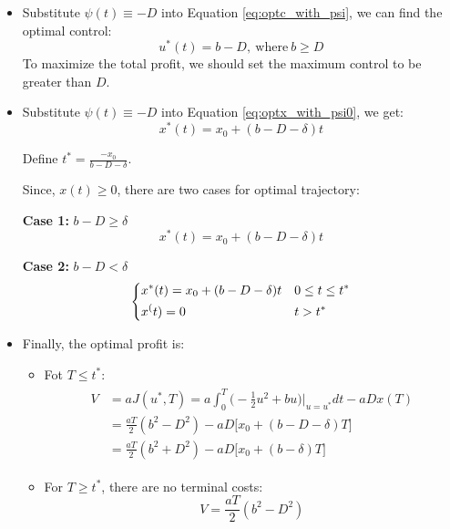 \documentclass{article}
\begin{document}
\begin{itemize}
    \item Substitute $\psi(t)\equiv-D$ into Equation \eqref{eq:optc_with_psi}, we can find the optimal control:
    \begin{equation}
        u^*(t)=b-D,\ \text{where}\ b\geq D
    \end{equation}
    To maximize the total profit, we should set the maximum control to be greater than $D$.
    \item Substitute $\psi(t)\equiv-D$ into Equation \eqref{eq:optx_with_psi0}, we get:
    \begin{equation}
        x^*(t)=x_0+(b-D-\delta)t
    \end{equation}

    Define $t^*=\frac{-x_0}{b-D-\delta}$.

    Since, $x(t)\geq 0$, there are two cases for optimal trajectory:

    {\bf Case 1:} $b-D\geq\delta$
    \begin{equation}\label{eq:optx_case1}
        x^*(t)=x_0+(b-D-\delta)t
    \end{equation}

    {\bf Case 2:} $b-D<\delta$
    \begin{equation}\label{eq:optx_case2}
        \begin{dcases}
            x^*(t)=x_0+(b-D-\delta)t & 0\leq t\leq t^*\\
            x^(t)=0 & t>t^*
        \end{dcases}
    \end{equation}

    \item Finally, the optimal profit is:
    \begin{itemize}
        \item Fot $T\leq t^*$:
        \begin{gather}
            \begin{aligned}
                V&=aJ(u^*,T)=a\int_{0}^{T}\big(-\frac{1}{2}u^2+bu\big)\bigg|_{u=u^*}dt-aDx(T)\\
               &=\frac{aT}{2}(b^2-D^2)-aD\big[x_0+(b-D-\delta)T\big]\\
               &=\frac{aT}{2}(b^2+D^2)-aD\big[x_0+(b-\delta)T\big]
            \end{aligned}
        \end{gather}
        \item For $T\ge t^*$, there are no terminal costs:
        \begin{equation}
            V=\frac{aT}{2}(b^2-D^2)
        \end{equation}
    \end{itemize}

\end{itemize}


\end{document}
